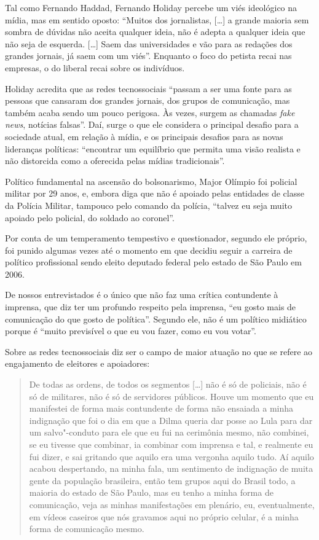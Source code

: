 Tal como Fernando Haddad, Fernando Holiday percebe um viés ideológico na
mídia, mas em sentido oposto: ``Muitos dos jornalistas, {[}\ldots{}{]} a
grande maioria sem sombra de dúvidas não aceita qualquer ideia, não é
adepta a qualquer ideia que não seja de esquerda. {[}\ldots{}{]} Saem das
universidades e vão para as redações dos grandes jornais, já saem com um
viés''. Enquanto o foco do petista recai nas empresas, o do liberal
recai sobre os indivíduos.

Holiday acredita que as redes tecnossociais ``passam a ser uma fonte
para as pessoas que cansaram dos grandes jornais, dos grupos de
comunicação, mas também acaba sendo um pouco perigosa. Às vezes, surgem
as chamadas \emph{fake news}, notícias falsas''. Daí, surge o que ele
considera o principal desafio para a sociedade atual, em relação à
mídia, e os principais desafios para as novas lideranças políticas:
``encontrar um equilíbrio que permita uma visão realista e não
distorcida como a oferecida pelas mídias tradicionais''.

Político fundamental na ascensão do bolsonarismo, Major Olímpio foi
policial militar por 29 anos, e, embora diga que não é apoiado pelas
entidades de classe da Polícia Militar, tampouco pelo comando da
polícia, ``talvez eu seja muito apoiado pelo policial, do soldado ao
coronel''.

Por conta de um temperamento tempestivo e questionador, segundo ele
próprio, foi punido algumas vezes até o momento em que decidiu seguir a
carreira de político profissional sendo eleito deputado federal pelo
estado de São Paulo em 2006.

De nossos entrevistados é o único que não faz uma crítica contundente à
imprensa, que diz ter um profundo respeito pela imprensa, ``eu gosto
mais de comunicação do que gosto de política''. Segundo ele, não é um
político midiático porque é ``muito previsível o que eu vou fazer, como
eu vou votar''.

Sobre as redes tecnossociais diz ser o campo de maior atuação no que se
refere ao engajamento de eleitores e apoiadores:

\begin{quote}
De todas as ordens, de todos os segmentos {[}\ldots{}{]} não é só de
policiais, não é só de militares, não é só de servidores públicos. Houve
um momento que eu manifestei de forma mais contundente de forma não
ensaiada a minha indignação que foi o dia em que a Dilma queria dar
posse ao Lula para dar um salvo"-conduto para ele que eu fui na cerimônia
mesmo, não combinei, se eu tivesse que combinar, ia combinar com
imprensa e tal, e realmente eu fui dizer, e sai gritando que aquilo era
uma vergonha aquilo tudo. Aí aquilo acabou despertando, na minha fala,
um sentimento de indignação de muita gente da população brasileira,
então tem grupos aqui do Brasil todo, a maioria do estado de São Paulo,
mas eu tenho a minha forma de comunicação, veja as minhas manifestações
em plenário, eu, eventualmente, em vídeos caseiros que nós gravamos aqui
no próprio celular, é a minha forma de comunicação mesmo.
\end{quote}

